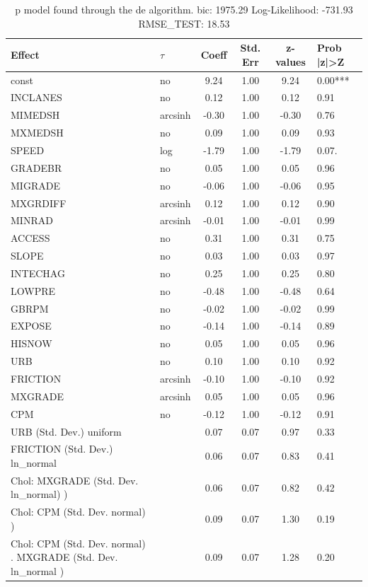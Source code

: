\begin{table}
	\caption{p model found through the de algorithm. bic: 1975.29 Log-Likelihood: -731.93 RMSE_TEST: 18.53}
	\begin{center}
		\begin{tabular}{|l|l|c|c|c|l|}
			\hline
			Effect & $\tau$ & Coeff & Std. Err & z-values & Prob |z|>Z \\
			\hline
			const & no & 9.24 & 1.00 & 9.24 & 0.00*** \\
			\hline
			INCLANES & no & 0.12 & 1.00 & 0.12 & 0.91 \\
			\hline
			MIMEDSH & arcsinh & -0.30 & 1.00 & -0.30 & 0.76 \\
			\hline
			MXMEDSH & no & 0.09 & 1.00 & 0.09 & 0.93 \\
			\hline
			SPEED & log & -1.79 & 1.00 & -1.79 & 0.07. \\
			\hline
			GRADEBR & no & 0.05 & 1.00 & 0.05 & 0.96 \\
			\hline
			MIGRADE & no & -0.06 & 1.00 & -0.06 & 0.95 \\
			\hline
			MXGRDIFF & arcsinh & 0.12 & 1.00 & 0.12 & 0.90 \\
			\hline
			MINRAD & arcsinh & -0.01 & 1.00 & -0.01 & 0.99 \\
			\hline
			ACCESS & no & 0.31 & 1.00 & 0.31 & 0.75 \\
			\hline
			SLOPE & no & 0.03 & 1.00 & 0.03 & 0.97 \\
			\hline
			INTECHAG & no & 0.25 & 1.00 & 0.25 & 0.80 \\
			\hline
			LOWPRE & no & -0.48 & 1.00 & -0.48 & 0.64 \\
			\hline
			GBRPM & no & -0.02 & 1.00 & -0.02 & 0.99 \\
			\hline
			EXPOSE & no & -0.14 & 1.00 & -0.14 & 0.89 \\
			\hline
			HISNOW & no & 0.05 & 1.00 & 0.05 & 0.96 \\
			\hline
			URB & no & 0.10 & 1.00 & 0.10 & 0.92 \\
			\hline
			FRICTION & arcsinh & -0.10 & 1.00 & -0.10 & 0.92 \\
			\hline
			MXGRADE & arcsinh & 0.05 & 1.00 & 0.05 & 0.96 \\
			\hline
			CPM & no & -0.12 & 1.00 & -0.12 & 0.91 \\
			\hline
			URB (Std. Dev.) uniform &  & 0.07 & 0.07 & 0.97 & 0.33 \\
			\hline
			FRICTION (Std. Dev.) ln_normal &  & 0.06 & 0.07 & 0.83 & 0.41 \\
			\hline
			 Chol: MXGRADE (Std. Dev. ln_normal) ) &  & 0.06 & 0.07 & 0.82 & 0.42 \\
			\hline
			 Chol: CPM (Std. Dev. normal) ) &  & 0.09 & 0.07 & 1.30 & 0.19 \\
			\hline
			 Chol: CPM (Std. Dev. normal) . MXGRADE (Std. Dev.   ln_normal ) &  & 0.09 & 0.07 & 1.28 & 0.20 \\
			\hline
		\end{tabular}
	\end{center}
\end{table}
